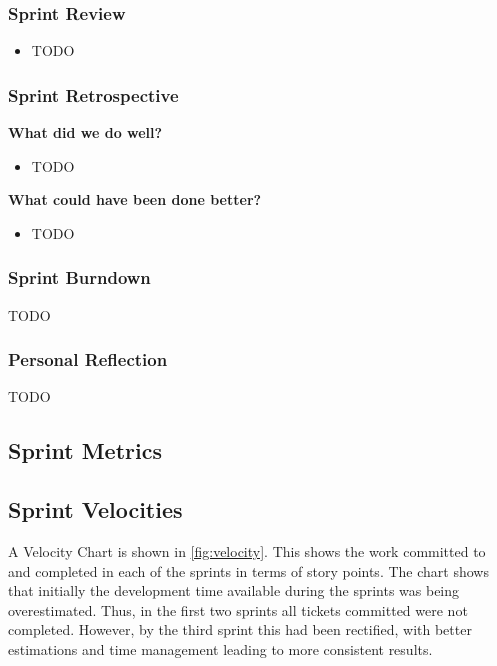   \subsubsection{Sprint Review}
  
  \begin{itemize}
    \item TODO
  \end{itemize}
  
  \subsubsection{Sprint Retrospective}
  \textbf{What did we do well?}
  \begin{itemize}
    \item TODO
  \end{itemize}
  
  \noindent\textbf{What could have been done better?}
  \begin{itemize}
    \item TODO
  \end{itemize}
  
  \subsubsection{Sprint Burndown}
  
  TODO
  
  \subsubsection{Personal Reflection}
  TODO
  

	\subsection{Sprint Metrics}
  
  \subsection{Sprint Velocities}
  A Velocity Chart is shown in \autoref{fig:velocity}.  This shows the work committed to and completed in each of the sprints in terms of story points. The chart shows that initially the development time available during the sprints was being overestimated. Thus, in the first two sprints all tickets committed were not completed. However, by the third sprint this had been rectified, with better estimations and time management leading to  more consistent results.
  
